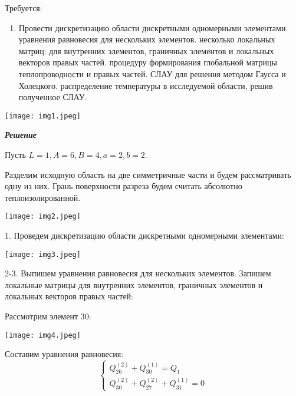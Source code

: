 \documentclass[a4paper, 12pt]{article}
\begin{document}
Требуется:
\begin{enumerate}
\item	Провести дискретизацию области дискретными одномерными элементами.
 уравнения равновесия для нескольких элементов.
 несколько локальных матриц: для внутренних элементов, граничных элементов и локальных векторов правых частей.
 процедуру формирования глобальной матрицы теплопроводности и правых частей.
 СЛАУ для решения методом Гаусса и Холецкого.
 распределение температуры в исследуемой области, решив полученное СЛАУ. 
\end{enumerate}

\texttt{[image: img1.jpeg]}

\newpage

\begin{center}
\textbf{\textit{Решение}}
\end{center}

Пусть $L=1, A=6, B=4, a=2, b=2$.

Разделим исходную область на две симметричные части и будем рассматривать одну из них. Грань
поверхности разреза будем считать абсолютно теплоизолированной.

\begin{center}
\texttt{[image: img2.jpeg]}
\end{center}

1. Проведем дискретизацию области дискретными одномерными элементами:

\begin{center}
\texttt{[image: img3.jpeg]}
\end{center}

2-3. Выпишем уравнения равновесия для нескольких элементов. Запишем локальные матрицы для внутренних элементов, граничных элементов и локальных векторов правых частей:

Рассмотрим элемент 30: 
\begin{center}
\texttt{[image: img4.jpeg]}
\end{center}

Составим уравнения равновесия:
\begin{equation} \label{eq1}
\begin{cases}
Q_{26}^{(2)} + Q_{30}^{(1)} = Q_1\\
Q_{30}^{(2)} + Q_{27}^{(2)} + Q_{31}^{(1)} = 0
\end{cases}
\end{equation} 
\end{document}
